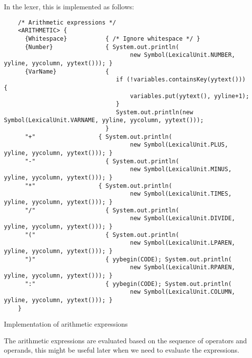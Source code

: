 	In the lexer, this is implemented as follows:

	\begin{verbatim}
	/* Arithmetic expressions */
	<ARITHMETIC> {
	  {Whitespace}           { /* Ignore whitespace */ }
	  {Number}               { System.out.println(
									new Symbol(LexicalUnit.NUMBER, yyline, yycolumn, yytext())); }
	  {VarName}              {
								if (!variables.containsKey(yytext())) {
									variables.put(yytext(), yyline+1);
								}
								System.out.println(new Symbol(LexicalUnit.VARNAME, yyline, yycolumn, yytext()));
							 }
	  "+"                  { System.out.println(
									new Symbol(LexicalUnit.PLUS, yyline, yycolumn, yytext())); }
	  "-"                    { System.out.println(
									new Symbol(LexicalUnit.MINUS, yyline, yycolumn, yytext())); }
	  "*"                  { System.out.println(
									new Symbol(LexicalUnit.TIMES, yyline, yycolumn, yytext())); }
	  "/"                    { System.out.println(
									new Symbol(LexicalUnit.DIVIDE, yyline, yycolumn, yytext())); }
	  "("                    { System.out.println(
									new Symbol(LexicalUnit.LPAREN, yyline, yycolumn, yytext())); }
	  ")"                    { yybegin(CODE); System.out.println(
									new Symbol(LexicalUnit.RPAREN, yyline, yycolumn, yytext())); }
	  ":"                    { yybegin(CODE); System.out.println(
									new Symbol(LexicalUnit.COLUMN, yyline, yycolumn, yytext())); }
	}

	\end{verbatim}

    \begin{table}[h]
		\centering
		\caption{Implementation of arithmetic expressions}
	\end{table}

	The arithmetic expressions are evaluated based on the sequence of operators and operands, this might be useful later when we need to evaluate the expressions.\\

